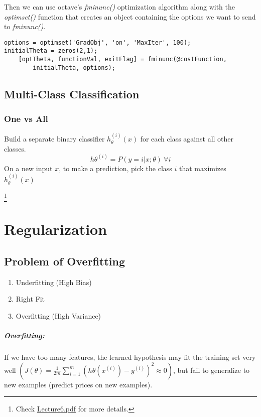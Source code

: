 \documentclass[a4paper, 12pt]{report}
\newcommand\blfootnote[1]{
	\begingroup
	\renewcommand\thefootnote{}\footnote{#1}
	\addtocounter{footnote}{-1}
	\endgroup
}
\begin{document}
Then we can use octave's \emph{fminunc()} optimization algorithm along with the
\emph{optimset()} function that creates an object containing the options we
want to send to \emph{fminunc()}.
\begin{verbatim}
options = optimset('GradObj', 'on', 'MaxIter', 100);
initialTheta = zeros(2,1);
	[optTheta, functionVal, exitFlag] = fminunc(@costFunction, 
		initialTheta, options);
\end{verbatim}

\section{Multi-Class Classification}
\subsection{One vs All}
Build a separate binary classifier $h_\theta^{(i)}(x)$ for each class against all
other classes.
\begin{equation*}
	h\theta^{(i)} = P(y = i | x; \theta)\ \forall i
\end{equation*}
On a new input $x$, to make a prediction, pick the class $i$ that maximizes
$h_\theta^{(i)}(x)$

\blfootnote{Check \href{lecture_pdf/Lecture6.pdf}{Lecture6.pdf} for more details.}

\chapter{Regularization}
\section{Problem of Overfitting}
\begin{enumerate}
	\item Underfitting (High Bias)
	\item Right Fit
	\item Overfitting (High Variance)
\end{enumerate}
\paragraph{Overfitting:} If we have too many features, the learned hypothesis may fit
the training set very well
$\left(J(\theta) = \frac{1}{2m}\sum_{i=1}^m(h\theta(x^{(i)}) - y^{(i)})^2 \approx 0\right)$,
but fail to generalize to new examples (predict prices on new examples).
\end{document}
